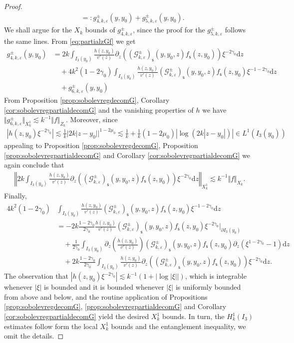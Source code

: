\documentclass[11pt,reqno]{amsproc}
\theoremstyle{definition}
\numberwithin{equation}{section}
\newcommand{\G}{{\mathcal{G}}}
\newcommand{\s}{{\mathsf{s}}}
\renewcommand{\d}{\mathrm{d}}
\newcommand{\ep}{\varepsilon}
\begin{document}
\begin{proof}
\begin{align*}
&=: g_{4,k,\ep}^\pm(y,y_0) + g_{5,k,\ep}^\pm(y,y_0).
\end{align*}
We shall argue for the $X_k$ bounds of $g_{4,k,\ep}^\pm$, since the proof for the $g_{5,k,\ep}^\pm$ follows the same lines. From \eqref{eq:partialzGf} we get
\begin{align*}
g_{4,k,\ep}^\pm(y,y_0) &=  2k\int_{I_3(y_0)} \frac{h(z,y_0)}{v'(z)} \partial_z \left( \left(\G_{k,\ep}^\pm\right)_\s (y,y_0,z) f_\s(z, y_0) \right) \xi^{-2\gamma_0} \d z \\
&\quad + 4k^2 (1-2\gamma_0)\int_{I_3(y_0)} \frac{h(z,y_0)}{v'(z)}  \left(\G_{k,\ep}^\pm\right)_\s(y,y_0,z) f_\s(z, y_0) \xi^{-1-2\gamma_0} \d z \\
&\quad + g_{6,k,\ep}^\pm(y,y_0)
\end{align*}
From Proposition \ref{prop:sobolevregdecomG}, Corollary \ref{cor:sobolevregpartialdecomG} and the vanishing properties of $h$ we have $\Vert g_{6,k,\ep}^\pm\Vert_{X_k^1}\lesssim k^{-1}\Vert f \Vert_{Z_k}$. Moreover, since 
\begin{align*}
\left| h(z,y_0) \xi^{-2\gamma_0}\right| \lesssim \frac{1}{k}|2k|z-y_0||^{1-2\mu_0} \lesssim \frac{1}{k} + \frac{1}{k} (1-2\mu_0) |\log(2k|z-y_0|) | \in L^1(I_3(y_0))
\end{align*}	
appealing to Proposition \ref{prop:sobolevregdecomG}, Proposition \ref{prop:sobolevregpartialdecomG} and Corollary \ref{cor:sobolevregpartialdecomG} we again conclude that
\begin{align*}
\left \Vert 2k\int_{I_3(y_0)} \frac{h(z,y_0)}{v'(z)} \partial_z \left( \left(\G_{k,\ep}^\pm\right)_\s (y,y_0,z) f_\s(z, y_0) \right) \xi^{-2\gamma_0} \d z  \right\Vert_{X_k^1}\lesssim k^{-1}\Vert f \Vert_{X_k}.
\end{align*}
Finally,
\begin{align*}
4k^2 (1-2\gamma_0)&\int_{I_3(y_0)} \frac{h(z,y_0)}{v'(z)}  \left(\G_{k,\ep}^\pm\right)_\s(y,y_0,z) f_\s(z, y_0) \xi^{-1-2\gamma_0} \d z \\
&= - 2k\frac{1-2\gamma_0}{2\gamma_0} \frac{h(z,y_0)}{v'(z)}  \left(\G_{k,\ep}^\pm\right)_\s(y,y_0,z) f_\s(z, y_0) \xi^{-2\gamma_0} \Big|_{\partial I_3(y_0)} \\
&\quad + \frac{1}{2\gamma_0}\int_{I_3(y_0)} \partial_z \left( \frac{h(z,y_0)}{v'(z)} \right) \left(\G_{k,\ep}^\pm\right)_\s(y,y_0,z) f_\s(z, y_0) \partial_z \left(\xi^{1-2\gamma_0} -1\right) \d z \\
&\quad + 2k\frac{1-2\gamma_0}{2\gamma_0}\int_{I_3(y_0)} \frac{h(z,y_0)}{v'(z)} \partial_z \left( \left(\G_{k,\ep}^\pm\right)_\s(y,y_0,z) f_\s(z, y_0) \right) \xi^{-2\gamma_0} \d z.
\end{align*}
The observation that $\left| h(z,y_0) \xi^{-2\gamma_0}\right|\lesssim k^{-1}\left( 1 + |\log |\xi| | \right)$, which is integrable whenever $|\xi|$ is bounded and it is bounded whenever $|\xi|$ is uniformly bounded from above and below, and the routine application of Propositions \ref{prop:sobolevregdecomG},  \ref{prop:sobolevregpartialdecomG} and Corollary \ref{cor:sobolevregpartialdecomG}  yield the desired $X_k^1$ bounds. In turn, the $H^1_k(I_3)$ estimates follow form the local $X_k^1$ bounds and the entanglement inequality, we omit the details.
\end{proof}
\end{document}
